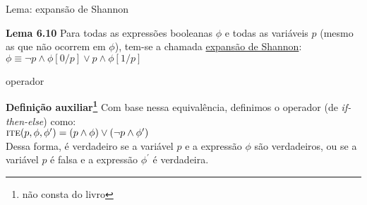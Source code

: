 \expandafter\documentclass\expandafter[table, usenames, svgnames, dvipsnames,14pt, \classopts]{beamer}
\begin{document}
\begin{frame}{Lema: expansão de Shannon}

    \begin{block}{\textbf{Lema 6.10}}
        Para todas as expressões booleanas $\phi$ e todas as variáveis $p$ (mesmo as que não ocorrem em $\phi$), tem-se a chamada \underline{expansão de Shannon}:\\[1em]
        $\phi \equiv \lnot{p} \land \phi[0/p] \lor p \land \phi[1/p]$
    \end{block}

\end{frame}

\begin{frame}{operador }

    \begin{block}{\textbf{Definição auxiliar\footnote{não consta do livro}}}
        Com base nessa equivalência, definimos o operador  (de \textit{if-then-else}) como:\\[1em]
        $\textproc{ite}(p,\phi,\phi^{\prime}) = (p \land \phi) \lor (\lnot{p} \land \phi^{\prime})$
        \\[1em]
        Dessa forma,  é verdadeiro se a variável $p$ e a expressão $\phi$ são verdadeiros, ou se a variável $p$ é falsa e a expressão $\phi^{\prime}$ é verdadeira.
    \end{block}

\end{frame}
\end{document}
